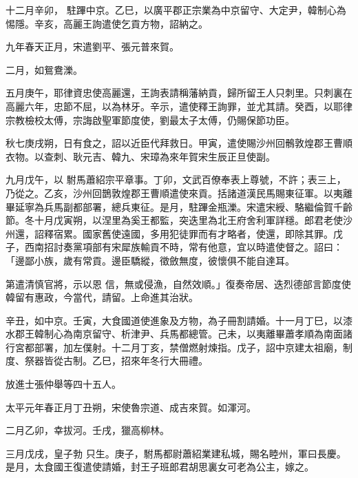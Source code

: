 \begin{pinyinscope}
 十二月辛卯，
 駐蹕中京。乙巳，以廣平郡正宗業為中京留守、大定尹，韓制心為惕隱。辛亥，高麗王詢遣使乞貢方物，詔納之。



 九年春天正月，宋遣劉平、張元普來賀。



 二月，如鴛鴦濼。



 五月庚午，耶律資忠使高麗還，王詢表請稱藩納貢，歸所留王人只刺里。只刺裏在高麗六年，忠節不屈，以為林牙。辛示，遣使釋王詢罪，並尤其請。癸酉，以耶律宗教檢校太傅，宗誨啟聖軍節度使，劉最太子太傅，仍賜保節功臣。



 秋七庚戌朔，日有食之，詔以近臣代拜救日。甲寅，遣使賜沙州回鶻敦煌郡王曹順衣物。以查刺、耿元吉、韓九、宋璋為來年賀宋生辰正旦使副。



 九月戊午，以
 駙馬蕭紹宗平章事。丁卯，文武百僚奉表上尊號，不許；表三上，乃從之。乙亥，沙州回鵲敦煌郡王曹順遣使來貢。括諸道漢民馬賜東征軍。以夷離畢延寧為兵馬副都部署，總兵東征。是月，駐蹕金瓶濼。宋遣宋綬、駱繼倫賀千齡節。冬十月戊寅朔，以涅里為奚王都監，突迭里為北王府舍利軍詳穩。郎君老使沙州還，詔釋宿累。國家舊使遠國，多用犯徒罪而有才略者，使還，即除其罪。戊子，西南招討奏黨項部有宋犀族輸貢不時，常有他意，宜以時遣使督之。詔曰：「邊鄙小族，歲有常貢。邊臣驕縱，徵斂無度，彼懷俱不能自達耳。



 第遣清慎官將，示以恩
 信，無或侵漁，自然效順。」復奏帝居、迭烈德部言節度使韓留有惠政，今當代，請留。上命進其治狀。



 辛丑，如中京。壬寅，大食國道使進象及方物，為子冊割請婚。十一月丁巳，以漆水郡王韓制心為南京留守、析津尹、兵馬都總管。己未，以夷離畢蕭孝順為南面諸行宮都部署，加左僕射。十二月丁亥，禁僧燃射煉指。戊子，詔中京建太祖廟，制度、祭器皆從古制。乙巳，招來年冬行大冊禮。



 放進士張仲舉等四十五人。



 太平元年春正月丁丑朔，宋使魯宗道、成吉來賀。如渾河。



 二月乙卯，幸拔河。壬戌，獵高柳林。



 三月戊戌，皇子勃
 只生。庚子，駙馬都尉蕭紹業建私城，賜名睦州，軍曰長慶。是月，太食國王復遣使請婚，封王子班郎君胡思裏女可老為公主，嫁之。




\end{pinyinscope}
